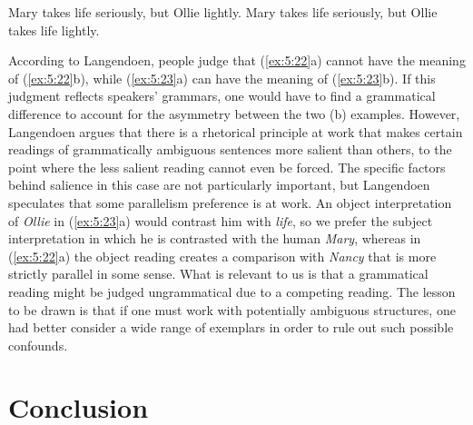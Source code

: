 \ea\label{ex:5:23}
\ea Mary takes life seriously, but Ollie lightly.
\ex Mary takes life seriously, but Ollie takes life lightly.
\z
\z

\noindent
According to Langendoen, people judge that (\ref{ex:5:22}a) cannot have the meaning of (\ref{ex:5:22}b), while (\ref{ex:5:23}a) can have the meaning of (\ref{ex:5:23}b). If this judgment reflects speakers' grammars, one would have to find a grammatical difference to account for the asymmetry between the two (b) examples. However, Langendoen argues that there is a rhetorical principle at work that makes certain readings of grammatically ambiguous sentences more salient than others, to the point where the less salient reading cannot even be forced. The specific factors behind salience in this case are not particularly important, but Langendoen speculates   that some parallelism    preference is at work. An object interpretation of \textit{Ollie} in (\ref{ex:5:23}a)  would
contrast him with \textit{life}, so we prefer the subject interpretation in which he is contrasted with the human \textit{Mary}, whereas in (\ref{ex:5:22}a) the object reading creates a comparison with \textit{Nancy} that is more strictly parallel in some sense. What is relevant to us is that a grammatical reading might be judged ungrammatical due to a competing reading. The lesson to be drawn is that if one must work with potentially ambiguous structures, one had better consider a wide range of exemplars in order to rule out such possible confounds.

\section{Conclusion} \label{sec:5.4}

